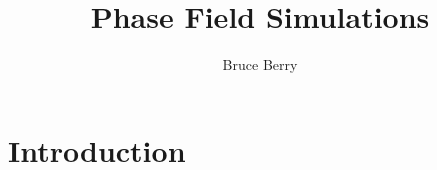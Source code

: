 \documentclass{report}
\begin{document}
    \title{Phase Field Simulations}
    \author{Bruce Berry}
    \maketitle

    \section{Introduction}
\end{document}
